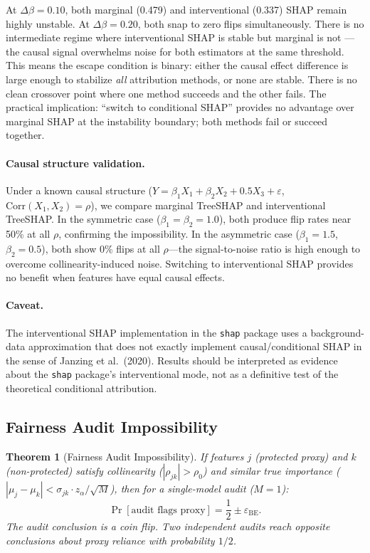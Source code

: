 \documentclass{article}
\newtheorem{theorem}{Theorem}
\begin{document}
At $\Delta\beta = 0.10$, both marginal (0.479) and interventional
(0.337) SHAP remain highly unstable. At $\Delta\beta = 0.20$,
both snap to zero flips simultaneously. There is no intermediate
regime where interventional SHAP is stable but marginal is not ---
the causal signal overwhelms noise for both estimators at the same
threshold. This means the escape condition is binary: either the
causal effect difference is large enough to stabilize \emph{all}
attribution methods, or none are stable. There is no clean crossover point where one method succeeds and the other fails. The practical implication:
``switch to conditional SHAP'' provides no advantage over marginal
SHAP at the instability boundary; both methods fail or succeed
together.

\paragraph{Causal structure validation.}
\begin{sloppypar}
Under a known causal structure ($Y = \beta_1 X_1 + \beta_2 X_2 + 0.5 X_3 + \varepsilon$,
$\text{Corr}(X_1, X_2) = \rho$), we compare marginal TreeSHAP and interventional
TreeSHAP. In the symmetric case ($\beta_1 = \beta_2 = 1.0$), both produce flip rates
near 50\% at all $\rho$, confirming the impossibility. In the asymmetric case
($\beta_1 = 1.5$, $\beta_2 = 0.5$), both show 0\% flips at all $\rho$---the
signal-to-noise ratio is high enough to overcome collinearity-induced noise.
Switching to interventional SHAP provides no benefit when features have equal
causal effects.
\end{sloppypar}

\paragraph{Caveat.}
The interventional SHAP implementation in the \texttt{shap} package uses a background-data approximation that does not exactly implement causal/conditional SHAP in the sense of Janzing et al.\ (2020). Results should be interpreted as evidence about the \texttt{shap} package's interventional mode, not as a definitive test of the theoretical conditional attribution.

\subsection{Fairness Audit Impossibility}
\label{sec:fairness}

\begin{theorem}[Fairness Audit Impossibility]
\label{thm:fairness-audit}
If features $j$ (protected proxy) and $k$ (non-protected) satisfy collinearity ($|\rho_{jk}| > \rho_0$) and similar true importance ($|\mu_j - \mu_k| < \sigma_{jk} \cdot z_\alpha / \sqrt{M}$), then for a single-model audit ($M{=}1$):
\[
    \Pr[\text{audit flags proxy}] = \frac{1}{2} \pm \varepsilon_{\text{BE}}.
\]
The audit conclusion is a coin flip. Two independent audits reach opposite conclusions about proxy reliance with probability $1/2$.
\end{theorem}
\end{document}

